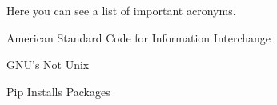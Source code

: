 %
%

Here you can see a list of important acronyms.
\begin{description}[list]
\item[ASCII]{American Standard Code for Information Interchange}
\item[GNU]{GNU's Not Unix}
\item[pip]{Pip Installs Packages}
\end{description}